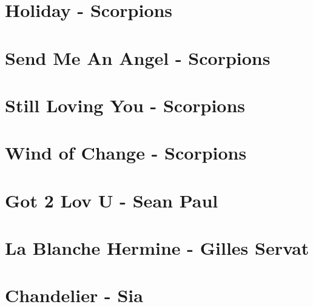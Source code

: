 \documentclass{guitartabs}
\begin{document}
\section*{Holiday - Scorpions}
\begin{guitar}

\end{guitar}

\section{Send Me An Angel - Scorpions}
\begin{guitar}

\end{guitar}


\section{Still Loving You - Scorpions}
\begin{guitar}

\end{guitar}

\section*{Wind of Change - Scorpions}
\begin{guitar}

\end{guitar}

\section{Got 2 Lov U - Sean Paul}
\begin{guitar}

\end{guitar}



\section{La Blanche Hermine - Gilles Servat}
\begin{guitar}

\end{guitar}

\section{Chandelier - Sia}
\begin{guitar}

\end{guitar}
\end{document}
